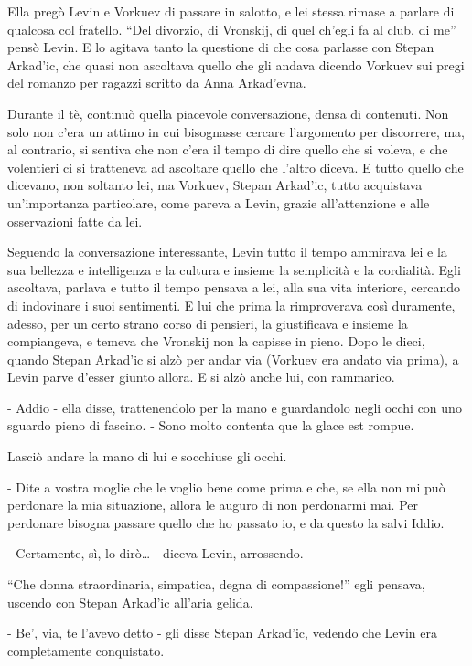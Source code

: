 Ella pregò Levin e Vorkuev di passare in salotto, e lei stessa rimase a parlare di qualcosa col fratello. ``Del divorzio, di Vronskij, di quel ch'egli fa al club, di me'' pensò Levin. E lo agitava tanto la questione di che cosa parlasse con Stepan Arkad'ic, che quasi non ascoltava quello che gli andava dicendo Vorkuev sui pregi del romanzo per ragazzi scritto da Anna Arkad'evna. 

Durante il tè, continuò quella piacevole conversazione, densa di contenuti. Non solo non c'era un attimo in cui bisognasse cercare l'argomento per discorrere, ma, al contrario, si sentiva che non c'era il tempo di dire quello che si voleva, e che volentieri ci si tratteneva ad ascoltare quello che l'altro diceva. E tutto quello che dicevano, non soltanto lei, ma Vorkuev, Stepan Arkad'ic, tutto acquistava un'importanza particolare, come pareva a Levin, grazie all'attenzione e alle osservazioni fatte da lei. 

Seguendo la conversazione interessante, Levin tutto il tempo ammirava lei e la sua bellezza e intelligenza e la cultura e insieme la semplicità e la cordialità. Egli ascoltava, parlava e tutto il tempo pensava a lei, alla sua vita interiore, cercando di indovinare i suoi sentimenti. E lui che prima la rimproverava così duramente, adesso, per un certo strano corso di pensieri, la giustificava e insieme la compiangeva, e temeva che Vronskij non la capisse in pieno. Dopo le dieci, quando Stepan Arkad'ic si alzò per andar via (Vorkuev era andato via prima), a Levin parve d'esser giunto allora. E si alzò anche lui, con rammarico. 

- Addio - ella disse, trattenendolo per la mano e guardandolo negli occhi con uno sguardo pieno di fascino. - Sono molto contenta que la glace est rompue. 

Lasciò andare la mano di lui e socchiuse gli occhi. 

- Dite a vostra moglie che le voglio bene come prima e che, se ella non mi può perdonare la mia situazione, allora le auguro di non perdonarmi mai. Per perdonare bisogna passare quello che ho passato io, e da questo la salvi Iddio. 

- Certamente, sì, lo dirò\ldots{} - diceva Levin, arrossendo. 

``Che donna straordinaria, simpatica, degna di compassione!'' egli pensava, uscendo con Stepan Arkad'ic all'aria gelida. 

- Be', via, te l'avevo detto - gli disse Stepan Arkad'ic, vedendo che Levin era completamente conquistato. 

